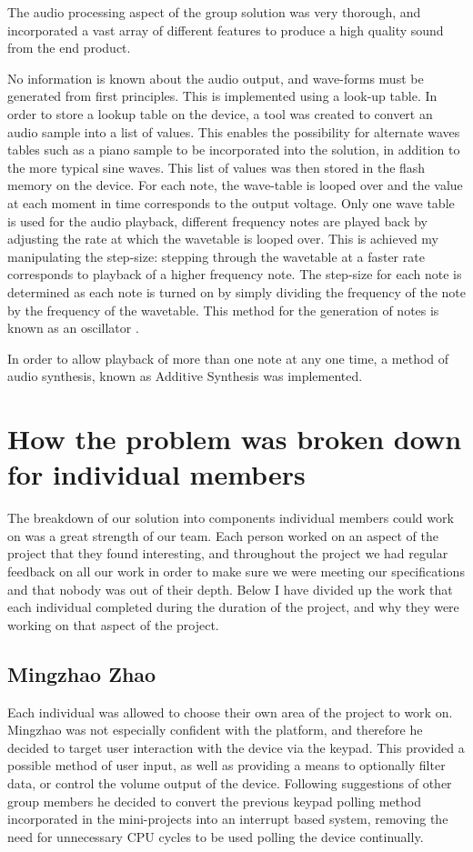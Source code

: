 The audio processing aspect of the group solution was very thorough, and 
incorporated a vast array of different features to produce a high quality sound 
from the end product.
\par\bigskip\noindent
No information is known about the audio output, and wave-forms must be generated 
from first principles. This is implemented using a look-up table. 
In order to store a lookup table on the device, a tool was created to convert 
an audio sample into a list of values. This enables the possibility for alternate 
waves tables such as a piano sample to be incorporated into the solution, in 
addition to the more typical sine waves. This list of values was then stored in 
the flash memory on the device.
For each note, the wave-table is looped over and the value at each moment in 
time corresponds to the output voltage. 
Only one wave table is used for the audio playback, different frequency notes are 
played back by adjusting the rate at which the wavetable is looped over. This is 
achieved my manipulating the step-size: stepping through the wavetable at a 
faster rate corresponds to playback of a higher frequency note. The step-size 
for each note is determined as each note is turned on by simply dividing the 
frequency of the note by the frequency of the wavetable. This method for the 
generation of notes is known as an oscillator \cite{puckette2007theory}.
\par\bigskip\noindent
In order to allow playback of more than one note at any one time, a method of 
audio synthesis, known as Additive Synthesis was implemented. 


\section{How the problem was broken down for individual members}

The breakdown of our solution into components individual members could work on 
was a great strength of our team. Each person worked on an aspect of the project 
that they found interesting, and throughout the project we had regular feedback 
on all our work in order to make sure we were meeting our specifications and 
that nobody was out of their depth. Below I have divided up the work that each 
individual completed during the duration of the project, and why they were 
working on that aspect of the project. 

\subsection*{Mingzhao Zhao}
Each individual was allowed to choose their own area of the project to work on. 
Mingzhao was not especially confident with the platform, and therefore he 
decided to target user interaction with the device via the keypad. This 
provided a possible method of user input, as well as providing a means to 
optionally filter data, or control the volume output of the device. 
Following suggestions 
of other group members he decided to convert the previous keypad polling method 
incorporated in the mini-projects into an interrupt based system, removing the 
need for unnecessary CPU cycles to be used polling the device continually. 

